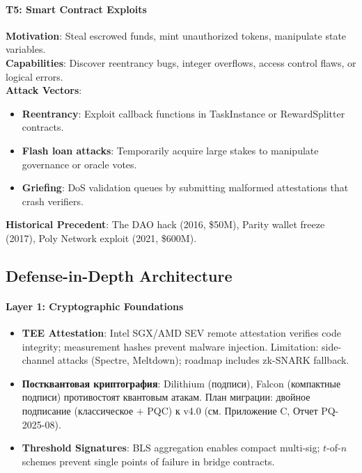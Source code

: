 \documentclass[11pt]{article}
\begin{document}
\paragraph{T5: Smart Contract Exploits}
\textbf{Motivation}: Steal escrowed funds, mint unauthorized tokens, manipulate state variables.\\
\textbf{Capabilities}: Discover reentrancy bugs, integer overflows, access control flaws, or logical errors.\\
\textbf{Attack Vectors}:
\begin{itemize}[noitemsep]
  \item \textbf{Reentrancy}: Exploit callback functions in TaskInstance or RewardSplitter contracts.
  \item \textbf{Flash loan attacks}: Temporarily acquire large stakes to manipulate governance or oracle votes.
  \item \textbf{Griefing}: DoS validation queues by submitting malformed attestations that crash verifiers.
\end{itemize}
\textbf{Historical Precedent}: The DAO hack (2016, \$50M), Parity wallet freeze (2017), Poly Network exploit (2021, \$600M).

\subsection{Defense-in-Depth Architecture}

\paragraph{Layer 1: Cryptographic Foundations}
\begin{itemize}[noitemsep]
  \item \textbf{TEE Attestation}: Intel SGX/AMD SEV remote attestation verifies code integrity; measurement hashes prevent malware injection. Limitation: side-channel attacks (Spectre, Meltdown); roadmap includes zk-SNARK fallback.
  \item \textbf{Постквантовая криптография}: Dilithium (подписи), Falcon (компактные подписи) противостоят квантовым атакам. План миграции: двойное подписание (классическое + PQC) к v4.0 (см. Приложение C, Отчет PQ-2025-08).
  \item \textbf{Threshold Signatures}: BLS aggregation enables compact multi-sig; $t$-of-$n$ schemes prevent single points of failure in bridge contracts.
\end{itemize}
\end{document}
